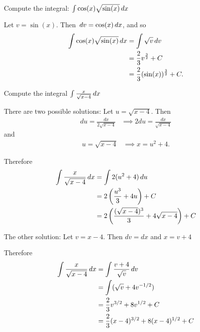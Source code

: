 \documentclass[nooutcomes]{ximera}
\begin{document}
\begin{problem}

Compute the  integral: $\int \cos(x) \sqrt{\sin(x)} \,d x$
  \begin{freeResponse}
		Let $v = \sin(x)$.  Then $\,d v = \cos(x) \,d x$, and so
		\begin{align*}
			\int \cos(x) \sqrt{\sin(x)} \,d x &= \int \sqrt{v} \,d v  \\
			&= \frac{2}{3} v^{\frac{3}{2}} + C  \\
			&= \frac{2}{3} (\sin(x))^{\frac{3}{2}} + C.
		\end{align*}
	\end{freeResponse}
\end{problem}

\begin{problem}
  
Compute the integral $\int \frac{x}{\sqrt{x-4}} \,d x$
	\begin{freeResponse}
	
	There are two possible solutions:
    Let $u = \sqrt{x - 4}$.
    Then
    \begin{align*}
      du = \frac{dx}{2\sqrt{x-4}}
      &\implies 2du = \frac{dx}{\sqrt{x-4}}
    \end{align*}
    and
    \begin{align*}
      u = \sqrt{x - 4}
      &\implies x = u^2 +4.
    \end{align*}

    Therefore
    \begin{align*}
      \int \frac{x}{\sqrt{x-4}} \,d x
      &= \int 2(u^2 + 4) \,d u \\
      &= 2\left(\frac{u^3}{3} + 4u \right) + C\\
      &= 2\left(\frac{(\sqrt{x-4})^3}{3} + 4\sqrt{x-4}\right)+C
    \end{align*}
    
    The other solution:
        Let $v = x - 4$.
    Then
       $dv = dx$ and $x=v+4$


     Therefore
    \begin{align*}
      \int \frac{x}{\sqrt{x-4}} \,d x
      &= \int \frac{v+4}{\sqrt{v}} \,d v \\
      &= \int (\sqrt{v}+4v^{-1/2})\\
      &= \frac{2}{3}v^{3/2}+8v^{1/2}+ C\\
      &= \frac{2}{3}(x-4)^{3/2}+8(x-4)^{1/2}+ C
          \end{align*}
    	\end{freeResponse}
\end{problem}
\end{document}
